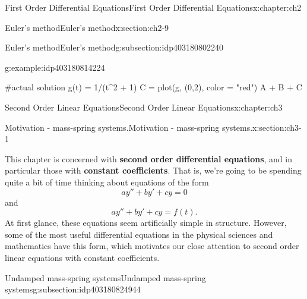 \documentclass[oneside,10pt,]{book}
\newcommand{\terminology}[1]{\textbf{#1}}
\numberwithin{equation}{section}
\numberwithin{equation}{section}
\begin{document}
\begin{chapterptx}{First Order Differential Equations}{}{First Order Differential Equations}{}{}{x:chapter:ch2}
\begin{sectionptx}{Euler's method}{}{Euler's method}{}{}{x:section:ch2-9}
\begin{subsectionptx}{Euler's method}{}{Euler's method}{}{}{g:subsection:idp403180802240}
\begin{example}{}{g:example:idp403180814224}
\begin{sageinput}
#actual solution
g(t) = 1/(t^2 + 1)
C = plot(g, (0,2), color = "red")
A + B + C
\end{sageinput}
\end{example}
\end{subsectionptx}
\end{sectionptx}
\end{chapterptx}
%
%
\typeout{************************************************}
\typeout{************************************************}
%
\begin{chapterptx}{Second Order Linear Equations}{}{Second Order Linear Equations}{}{}{x:chapter:ch3}
%
%
\typeout{************************************************}
\typeout{************************************************}
%
\begin{sectionptx}{Motivation - mass-spring systems.}{}{Motivation - mass-spring systems.}{}{}{x:section:ch3-1}
\begin{introduction}{}%
This chapter is concerned with \terminology{second order differential equations}, and in particular those with \terminology{constant coefficients}. That is, we're going to be spending quite a bit of time thinking about equations of the form%
\begin{equation*}
a y'' + b y' + c y = 0
\end{equation*}
and%
\begin{equation*}
a y'' + b y' + c y = f(t).
\end{equation*}
At first glance, these equations seem artificially simple in structure. However, some of the most useful differential equations in the physical sciences and mathematics have this form, which motivates our close attention to second order linear equations with constant coefficients.%
\end{introduction}%
%
%
\typeout{************************************************}
\typeout{************************************************}
%
\begin{subsectionptx}{Undamped mass-spring systems}{}{Undamped mass-spring systems}{}{}{g:subsection:idp403180824944}
\begin{image}{0}{1}{0}%

\end{image}
\end{subsectionptx}
\end{sectionptx}
\end{chapterptx}
\end{document}
